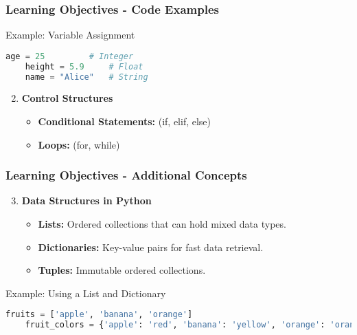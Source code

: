 \documentclass{beamer}
\begin{document}
\begin{frame}[fragile]
    \frametitle{Learning Objectives - Code Examples}
    \begin{block}{Example: Variable Assignment}
    \begin{lstlisting}[language=Python]
    age = 25         # Integer
    height = 5.9     # Float
    name = "Alice"   # String
    \end{lstlisting}
    \end{block}
    
    \begin{enumerate}
        \setcounter{enumi}{1} %
        \item \textbf{Control Structures}
        \begin{itemize}
            \item \textbf{Conditional Statements:} (if, elif, else)
            \item \textbf{Loops:} (for, while)
        \end{itemize}
    \end{enumerate}
\end{frame}

\begin{frame}[fragile]
    \frametitle{Learning Objectives - Additional Concepts}
    \begin{enumerate}
        \setcounter{enumi}{2} %
        \item \textbf{Data Structures in Python}
        \begin{itemize}
            \item \textbf{Lists:} Ordered collections that can hold mixed data types.
            \item \textbf{Dictionaries:} Key-value pairs for fast data retrieval.
            \item \textbf{Tuples:} Immutable ordered collections.
        \end{itemize}
    \end{enumerate}
    
    \begin{block}{Example: Using a List and Dictionary}
    \begin{lstlisting}[language=Python]
    fruits = ['apple', 'banana', 'orange']
    fruit_colors = {'apple': 'red', 'banana': 'yellow', 'orange': 'orange'}
    \end{lstlisting}
    \end{block}
\end{frame}
\end{document}

